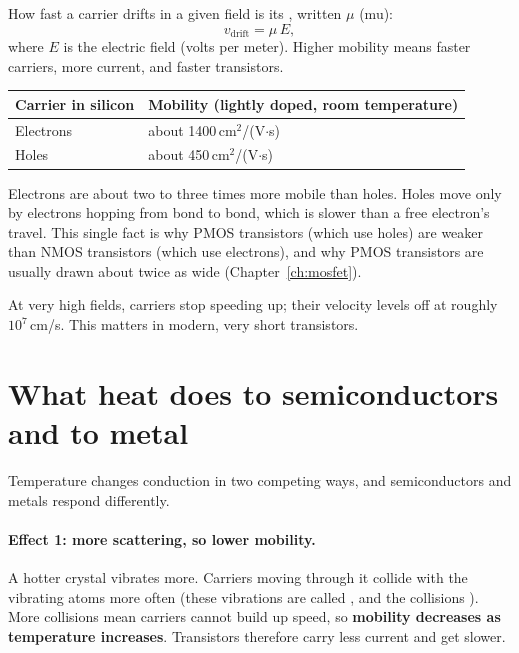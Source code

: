 How fast a carrier drifts in a given field is its , written $\mu$ (mu):
\[
  v_{\text{drift}} = \mu\,E,
\]
where $E$ is the electric field (volts per meter). Higher mobility means faster carriers, more current, and faster transistors.

\begin{center}
\begin{tabular}{ll}
\toprule
Carrier in silicon & Mobility (lightly doped, room temperature) \\
\midrule
Electrons & about 1400\,cm$^2$/(V$\cdot$s) \\
Holes & about 450\,cm$^2$/(V$\cdot$s) \\
\bottomrule
\end{tabular}
\end{center}

\begin{bigidea}
Electrons are about two to three times more mobile than holes. Holes move only by electrons hopping from bond to bond, which is slower than a free electron's travel. This single fact is why PMOS transistors (which use holes) are weaker than NMOS transistors (which use electrons), and why PMOS transistors are usually drawn about twice as wide (Chapter~\ref{ch:mosfet}).
\end{bigidea}

At very high fields, carriers stop speeding up; their velocity levels off at roughly $10^7$\,cm/s. This  matters in modern, very short transistors.

\section{What heat does to semiconductors and to metal}
\label{sec:tempmobility}

Temperature changes conduction in two competing ways, and semiconductors and metals respond differently.

\paragraph{Effect 1: more scattering, so lower mobility.} A hotter crystal vibrates more. Carriers moving through it collide with the vibrating atoms more often (these vibrations are called , and the collisions ). More collisions mean carriers cannot build up speed, so \textbf{mobility decreases as temperature increases}. Transistors therefore carry less current and get slower.

